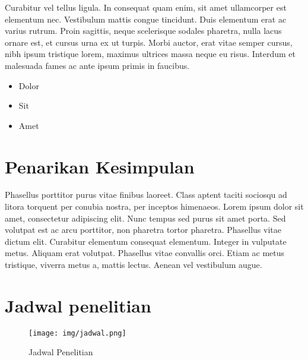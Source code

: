 Curabitur vel tellus ligula. In consequat quam enim, sit amet
ullamcorper est elementum nec. Vestibulum mattis congue
tincidunt. Duis elementum erat ac varius rutrum. Proin sagittis, neque
scelerisque sodales pharetra, nulla lacus ornare est, et cursus urna
ex ut turpis. Morbi auctor, erat vitae semper cursus, nibh ipsum
tristique lorem, maximus ultrices massa neque eu risus. Interdum et
malesuada fames ac ante ipsum primis in faucibus.

\begin{itemize}
\item Dolor
\item Sit
\item Amet
\end{itemize}


\section{Penarikan Kesimpulan}
\label{subsec:label}

Phasellus porttitor purus \citet{warn} vitae finibus laoreet. Class
aptent taciti sociosqu ad litora torquent per conubia nostra, per
inceptos himenaeos. Lorem ipsum dolor sit amet, consectetur adipiscing
elit. Nunc tempus sed purus sit amet porta. Sed volutpat est ac arcu
porttitor, non pharetra tortor pharetra. Phasellus vitae dictum
elit. Curabitur elementum consequat elementum. Integer in vulputate
metus. Aliquam erat volutpat. Phasellus vitae convallis orci. Etiam ac
metus tristique, viverra metus a, mattis lectus. Aenean vel vestibulum
augue.

\section{Jadwal penelitian}
\label{subsec:label}

\begin{figure}[tph]
  \centering
  \texttt{[image: img/jadwal.png]}
  \caption{Jadwal Penelitian}
  \label{fig:jadwal-penelitian}
\end{figure}
